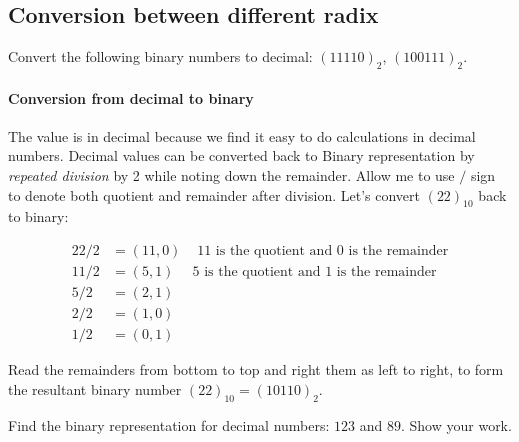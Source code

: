 \vspace{15em}
\begin{comment}
Numbers with base $2$ are called binary numbers. For example, the number
$(10110)_2$ has value:
\begin{align*}
  (10110)_2 &= 1 \times 2^4+ 0 \times 2^3 + 1\times 2^2 + 1 \times 2^1+ 0\times 2^0
              \\
            &= 22.
\end{align*}
\end{comment}

\subsection{Conversion between different radix}
\begin{example}
  Convert the following binary numbers to decimal: $(11110)_2$, $(100111)_2$.
\end{example}
\vspace{10em}

\paragraph{Conversion from decimal to binary}
The value is in decimal because we find it easy to do calculations in decimal
numbers. Decimal values can be converted back to Binary representation by
\emph{repeated division} by 2 while noting down the remainder. Allow me
to use $/$ sign to denote both quotient and remainder after division. Let's convert $(22)_{10}$
back to binary: 

\begin{align*}
  22 / 2 &= (11, 0) & \text{ 11 is the quotient and 0 is the remainder} \\
  11 / 2 &= (5, 1) & \text{5 is the quotient and 1 is the remainder}\\
  5 / 2 &= (2, 1) & \\ 
  2 / 2 &= (1, 0) & \\
  1 / 2 &= (0, 1) &
\end{align*}

Read the remainders from bottom to top and right them as left to right, to form the resultant binary number $(22)_{10} = (10110)_2$.

\begin{example}
Find the binary representation for decimal numbers: $123$ and $89$. Show your work.
\end{example}
\vspace{10em}


